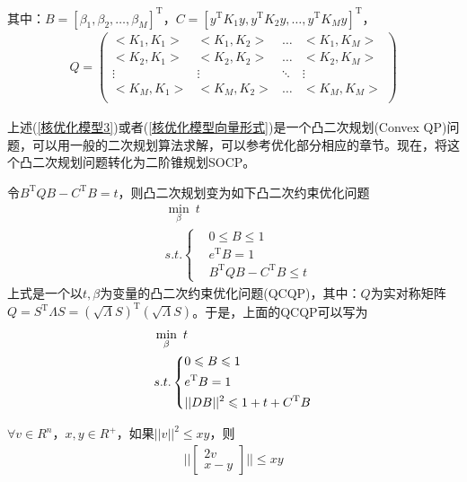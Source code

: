         其中：$B = [\beta_1,\beta_2,\dots,\beta_M]^\mathrm{T}$，$C = [y^\mathrm{T}K_1y,y^\mathrm{T}K_2y,\dots,y^\mathrm{T}K_My]^\mathrm{T}$，
        \begin{align*}
        Q =
        \begin{pmatrix}
        \bigl< K_1,K_1 \bigr>& \bigl< K_1,K_2 \bigr>& \dots & \bigl< K_1,K_M \bigr> \\
        \bigl< K_2,K_1 \bigr>& \bigl< K_2,K_2 \bigr>& \dots & \bigl< K_2,K_M \bigr> \\
        \vdots &\vdots &\ddots&\vdots\\
        \bigl< K_M,K_1 \bigr>& \bigl< K_M,K_2 \bigr>& \dots & \bigl< K_M,K_M \bigr> \\
        \end{pmatrix}
        \end{align*}
        \par
        上述(\ref{核优化模型3})或者(\ref{核优化模型向量形式})是一个凸二次规划(Convex QP)问题，可以用一般的二次规划算法求解，可以参考优化部分相应的章节。现在，将这个凸二次规划问题转化为二阶锥规划SOCP。
        \par
        令$B^\mathrm{T}QB - C^\mathrm{T}B = t$，则凸二次规划变为如下凸二次约束优化问题
        \begin{align*}
        &\min_\beta  \ t \\
        &s.t.
        \left\{
        \begin{aligned}
        & 0 \leqslant B \leqslant 1\\
        & e^\mathrm{T} B = 1 \\
        & B^\mathrm{T}QB - C^\mathrm{T}B \leqslant t
        \end{aligned}
        \right.
        \end{align*}
        上式是一个以$t,\beta$为变量的凸二次约束优化问题(QCQP)，其中：$Q$为实对称矩阵$Q = S^\mathrm{T}\varLambda S = (\sqrt{\varLambda}S)^\mathrm{T}(\sqrt{\varLambda}S)$。于是，上面的QCQP可以写为
        \begin{align}
        \label{核优化的QCQP问题}
        &\min_\beta  \ t \notag\\
        &s.t.
        \left\{
        \begin{aligned}
        & 0 \leqslant B \leqslant 1\\
        & e^\mathrm{T} B = 1 \\
        & ||DB||^2 \leqslant 1+t+ C^\mathrm{T}B
        \end{aligned}
        \right.
        \end{align}
        \begin{lemma}
        $\forall v \in R^n$，$x,y \in R^+$，如果$||v||^2 \leqslant xy $，则
        \begin{align*}
        \Biggl |\Biggl|
        \begin{bmatrix}
        2v\\
        x-y
        \end{bmatrix}
        \Biggr |\Biggr|
         \leqslant xy
        \end{align*}
        \end{lemma}

